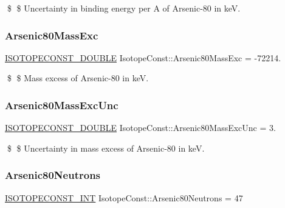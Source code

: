 \$ \$ Uncertainty in binding energy per A of Arsenic-\/80 in keV. \mbox{\label{group___isotope_const-_arsenic-_as80_ga1001f66cb14cef78d5077ba695a26750}} 
\subsubsection{\texorpdfstring{Arsenic80\+Mass\+Exc}{Arsenic80MassExc}}
{\footnotesize\ttfamily \mbox{\hyperlink{group___isotope_const-_macros_ga8f45a7272ce02c0b4c65c44636ed719a}{I\+S\+O\+T\+O\+P\+E\+C\+O\+N\+S\+T\+\_\+\+D\+O\+U\+B\+LE}} Isotope\+Const\+::\+Arsenic80\+Mass\+Exc = -\/72214.}

\$ \$ Mass excess of Arsenic-\/80 in keV. \mbox{\label{group___isotope_const-_arsenic-_as80_ga8489e02f2cc5988d78ba6e5694242b9f}} 
\subsubsection{\texorpdfstring{Arsenic80\+Mass\+Exc\+Unc}{Arsenic80MassExcUnc}}
{\footnotesize\ttfamily \mbox{\hyperlink{group___isotope_const-_macros_ga8f45a7272ce02c0b4c65c44636ed719a}{I\+S\+O\+T\+O\+P\+E\+C\+O\+N\+S\+T\+\_\+\+D\+O\+U\+B\+LE}} Isotope\+Const\+::\+Arsenic80\+Mass\+Exc\+Unc = 3.}

\$ \$ Uncertainty in mass excess of Arsenic-\/80 in keV. \mbox{\label{group___isotope_const-_arsenic-_as80_ga10e37554aa4312602ac6b31f1dea5c64}} 
\subsubsection{\texorpdfstring{Arsenic80\+Neutrons}{Arsenic80Neutrons}}
{\footnotesize\ttfamily \mbox{\hyperlink{group___isotope_const-_macros_ga5f18360b3e99483a35c32d789e62621c}{I\+S\+O\+T\+O\+P\+E\+C\+O\+N\+S\+T\+\_\+\+I\+NT}} Isotope\+Const\+::\+Arsenic80\+Neutrons = 47}

